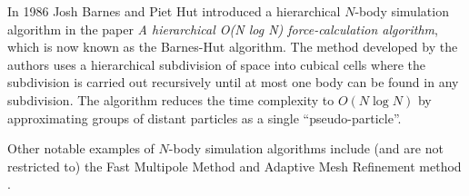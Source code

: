 In 1986 Josh Barnes and Piet Hut introduced a hierarchical $N$-body simulation algorithm in the paper \textit{A hierarchical O(N log N) force-calculation algorithm}, which is now known as the Barnes-Hut algorithm.
The method developed by the authors uses a hierarchical subdivision of space into cubical cells where the subdivision is carried out recursively until at most one body can be found in any subdivision.
The algorithm reduces the time complexity to $O(N \log N)$ by approximating groups of distant particles as a single ``pseudo-particle''.

Other notable examples of $N$-body simulation algorithms include (and are not restricted to) the Fast Multipole Method and Adaptive Mesh Refinement method \cite{trenti2008nbody}.
